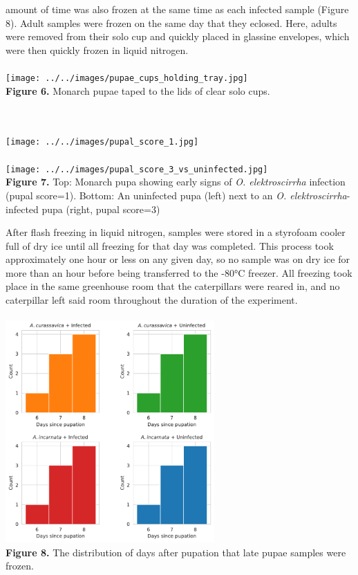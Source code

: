\documentclass{article}
\begin{document}
\begin{multicols}{2}
    amount of time was also frozen at the same time as each infected sample (Figure 8). Adult samples were frozen on the same day that they eclosed. Here, 
    adults were removed from their solo cup and quickly placed in glassine envelopes, which were then quickly frozen in liquid nitrogen.
    \\
    \\
    \texttt{[image: ../../images/pupae\_cups\_holding\_tray.jpg]} \\
    \caption{\textbf{Figure 6.} Monarch pupae taped to the lids of clear solo cups.}\\
    \\
    \texttt{[image: ../../images/pupal\_score\_1.jpg]} \\
    \\
    \texttt{[image: ../../images/pupal\_score\_3\_vs\_uninfected.jpg]} \\
    \caption{\textbf{Figure 7.} Top: Monarch pupa showing early signs of \emph{O. elektroscirrha} infection (pupal score=1).
                                Bottom: An uninfected pupa (left) next to an \emph{O. elektroscirrha}-infected pupa (right, pupal score=3)}

    \indent After flash freezing in liquid nitrogen, samples were stored in a styrofoam cooler full of dry ice until all freezing for that day 
    was completed. This process took approximately one hour or less on any given day, so no sample was on dry ice for more than an hour before 
    being transferred to the -80°C freezer. All freezing took place in the same greenhouse room that the caterpillars were reared in, and no 
    caterpillar left said room throughout the duration of the experiment. \\
    \\
    \includegraphics[width=80mm]{../../figures/late_pupal_age_distribution.pdf} \\
    \caption{\textbf{Figure 8.} The distribution of days after pupation that late pupae samples were frozen.}\\
    \\

\end{multicols}
\end{document}
